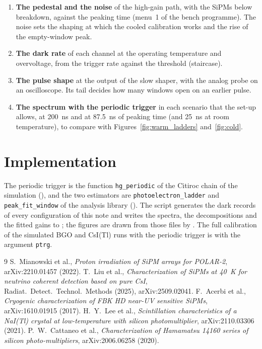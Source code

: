 \documentclass[11pt]{article}
\begin{document}
\begin{enumerate}
\item {\bf The pedestal and the noise} of the high-gain path, with the
  SiPMs below breakdown, against the peaking time (menu~1 of the bench
  programme). The noise sets the shaping at which the cooled calibration
  works and the rise of the empty-window peak.
\item {\bf The dark rate} of each channel at the operating temperature and
  overvoltage, from the trigger rate against the threshold (staircase).
\item {\bf The pulse shape} at the output of the slow shaper, with the
  analog probe on an oscilloscope. Its tail decides how many windows open
  on an earlier pulse.
\item {\bf The spectrum with the periodic trigger} in each scenario that
  the set-up allows, at 200~ns and at 87.5~ns of peaking time (and 25~ns at
  room temperature), to compare with Figures~\ref{fig:warm_ladders}
  and~\ref{fig:cold}.
\end{enumerate}

\section{Implementation}
\label{sec:implementation}

{\sloppy
The periodic trigger is the function \texttt{hg\_periodic} of the Citiroc
chain of the simulation (), and the two
estimators are \texttt{photoelectron\_ladder} and \texttt{peak\_fit\_window}
of the analysis library (). The
script  generates the
dark records of every configuration of this note and writes the spectra,
the decompositions and the fitted gains to
; the figures are drawn
from those files by .
The full calibration of the simulated BGO and CsI(Tl) runs with the
periodic trigger is  with
the argument \texttt{ptrg}.\par}

\begin{thebibliography}{9}
 S.~Mianowski et al., \emph{Proton irradiation of SiPM
  arrays for POLAR-2}, arXiv:2210.01457 (2022).
 T.~Liu et al., \emph{Characterization of SiPMs at 40~K
  for neutrino coherent detection based on pure CsI}, Radiat.\ Detect.\
  Technol.\ Methods (2025), arXiv:2509.02041.
 F.~Acerbi et al., \emph{Cryogenic characterization of
  FBK HD near-UV sensitive SiPMs}, arXiv:1610.01915 (2017).
 H.~Y.~Lee et al., \emph{Scintillation characteristics of a
  NaI(Tl) crystal at low-temperature with silicon photomultiplier},
  arXiv:2110.03306 (2021).
 P.~W.~Cattaneo et al., \emph{Characterization of
  Hamamatsu 14160 series of silicon photo-multipliers}, arXiv:2006.06258
  (2020).
\end{thebibliography}
\end{document}
